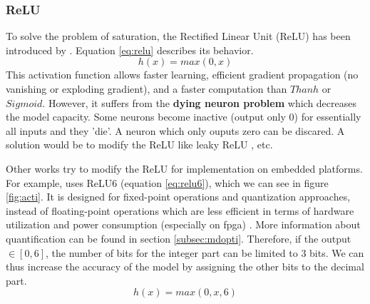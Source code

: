 \subsubsection{ReLU}
To solve the problem of saturation, the Rectified Linear Unit (ReLU) has been introduced by \textcite{krizhevsky_imagenet_2012}. Equation \eqref{eq:relu} describes its behavior.
\begin{equation}
    h(x) = max(0, x)
    \label{eq:relu}
\end{equation}
%
This activation function allows faster learning, efficient gradient propagation (no vanishing or exploding gradient), and a faster computation than $Thanh$ or $Sigmoid$. However, it suffers from the \textbf{dying neuron problem} which decreases the model capacity. Some neurons become inactive (output only 0) for essentially all inputs and they 'die'. A neuron which only ouputs zero can be discared. A solution would be to modify the ReLU like leaky ReLU \cite{maas_rectier_2014}, etc.

Other works try to modify the ReLU for implementation on embedded platforms. For example, \cite{howard_mobilenets_2017} uses ReLU6 (equation \ref{eq:relu6}), which we can see in figure \ref{fig:acti}. It is designed for fixed-point operations and quantization approaches, instead of floating-point operations which are less efficient in terms of hardware utilization and power consumption (especially on \acrshort{fpga}) \cite{david_hardware_2007}. More information about quantification can be found in section \ref{subsec:mdopti}. Therefore, if the output $\in [ 0, 6 ]$, the number of bits for the integer part can be limited to 3 bits. We can thus increase the accuracy of the model by assigning the other bits to the decimal part.
%
\begin{equation}
    h(x) = max(0, x, 6)
    \label{eq:relu6}
\end{equation}

